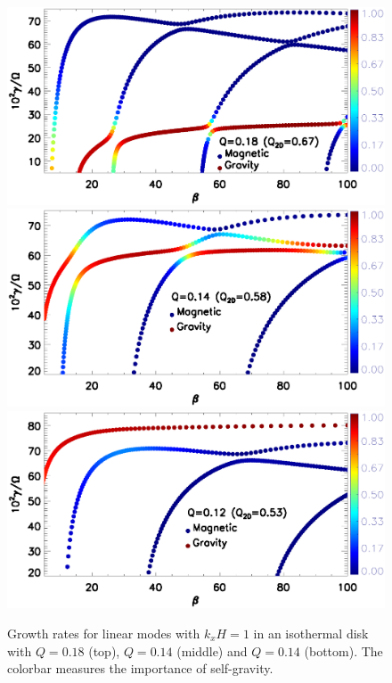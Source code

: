 \begin{figure}
  \includegraphics[width=\linewidth,clip=true,trim=0cm 2.1cm 0cm
    0cm]{figures/compare_growth3_kx1_Q0d18.ps} 
  \includegraphics[width=\linewidth,clip=true,trim=0cm 2.1cm 0cm
    0.5cm]{figures/compare_growth3_kx1_Q0d14.ps} 
  \includegraphics[width=\linewidth,clip=true,trim=0cm 0cm 0cm
    0.5cm]{figures/compare_growth3_kx1_Q0d12.ps} 
  \caption{Growth rates for linear modes with $k_xH=1$ in an isothermal disk with
    $Q=0.18$ (top), $Q=0.14$ (middle) and $Q=0.14$ (bottom). The
    colorbar measures the importance of 
    self-gravity.  
    \label{compare_growth3}}
\end{figure}

